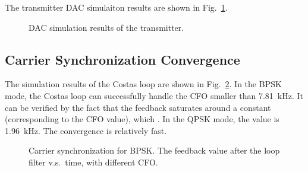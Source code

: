 \documentclass[journal,twoside]{IEEEtran}
\begin{document}
      The transmitter DAC simulaiton results are shown in Fig.~\ref{fig:tx_dac_sim}.
      \begin{figure}[h]
        \setlength{\tabcolsep}{2pt}
        \hfill%
        \caption{DAC simulation results of the transmitter.}
        \label{fig:tx_dac_sim}
      \end{figure}

    \subsection{Carrier Synchronization Convergence}\label{subsec:costas_convergence}

      The simulation results of the Costas loop are shown in Fig.~\ref{fig:sync_BPSK}.
      In the BPSK mode, the Costas loop can successfully handle the CFO smaller than \qty{7.81}{kHz}.
      It can be verified by the fact that the feedback saturates around a constant (corresponding to the CFO value),
      which .
      In the QPSK mode, the value is \qty{1.96}{kHz}.
      The convergence is relatively fast.
      \begin{figure}[htbp]
        \centering
        
        \caption{Carrier synchronization for BPSK. The feedback value after the loop filter v.s.\ time, with different CFO.}
        \label{fig:sync_BPSK}
      \end{figure}
      
\end{document}
